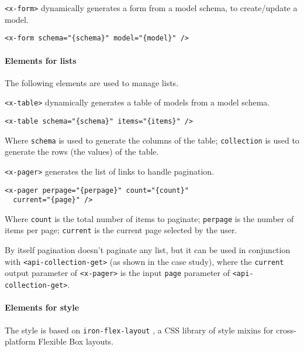 \texttt{<x-form>}  dynamically generates a form from a model schema, to create/update a model.

\begin{lstlisting}[language=HTML5]
<x-form schema="{schema}" model="{model}" />
\end{lstlisting}

\paragraph{Elements for lists}

The following elements are used to manage lists. 

\vspace{0.2cm}

\texttt{<x-table>}  dynamically generates a table of models from a model schema. 

\begin{lstlisting}[language=HTML5]
<x-table schema="{schema}" items="{items}" />
\end{lstlisting}

Where \texttt{schema} is used to generate the columns of the table; 
\texttt{collection} is used to generate the rows (the values) of the table.

\vspace{0.2cm}

\texttt{<x-pager>} generates the list of links to handle pagination.

\begin{lstlisting}[language=HTML5]
<x-pager perpage="{perpage}" count="{count}" 
  current="{page}" />
\end{lstlisting}

Where \texttt{count} is the total number of items to paginate; 
\texttt{perpage} is the number of items per page; 
\texttt{current} is the current page selected by the user.

By itself pagination doesn't paginate any list, but it can be used in conjunction with \texttt{<api-collection-get>} (as shown in the case study), where the \texttt{current} output parameter of \texttt{<x-pager>} is the input \texttt{page} parameter of \texttt{<api-collection-get>}.

\paragraph{Elements for style}

The style is based on \texttt{iron-flex-layout} \cite{iron-elements}, a CSS library of style mixins for cross-platform Flexible Box layouts.

